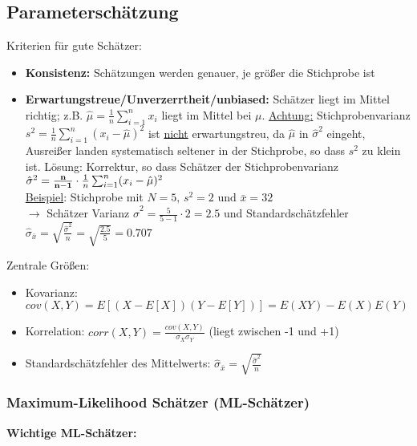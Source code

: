 \subsection{Parameterschätzung}

Kriterien für gute Schätzer:
\begin{itemize}
    \item \textbf{Konsistenz:} Schätzungen werden genauer, je größer die Stichprobe ist
    \item \textbf{Erwartungstreue/Unverzerrtheit/unbiased:} Schätzer liegt im Mittel richtig; z.B. \(\hat{\mu}=\frac{1}{n}\sum_{i=1}^{n}x_i\) liegt im Mittel bei \(\mu\). \underline{Achtung:} Stichprobenvarianz \(s^2=\frac{1}{n}\sum_{i=1}^{n}(x_i-\hat{\mu})^2\) ist \underline{nicht} erwartungstreu, da \(\hat{\mu}\) in \(\hat{\sigma}^2\) eingeht, Ausreißer landen systematisch seltener in der Stichprobe, so dass \(s^2\) zu klein ist. Lösung: Korrektur, so dass Schätzer der Stichprobenvarianz \(\hat{\sigma}^2=\bold{\frac{n}{n-1}}\cdot\frac{1}{n}\sum_{i=1}^{n}(x_i-\hat{\mu})^2\)\\
        \underline{Beispiel}: Stichprobe mit \(N=5\text{, }s^2=2 \text{ und } \bar{x}=32\)\\
        \(\rightarrow\) Schätzer Varianz \(\hat{\sigma}^2=\frac{5}{5-1}\cdot 2=2.5\) und Standardschätzfehler \(\hat{\sigma}_{\bar{x}}=\sqrt{\frac{\hat{\sigma}^2}{n}}=\sqrt{\frac{2.5}{5}}=0.707\)
\end{itemize}

Zentrale Größen:
\begin{itemize}
    \item Kovarianz: \(cov(X,Y)=E[(X-E[X])(Y-E[Y])]=E(XY)-E(X)E(Y)\)
    \item Korrelation: \(corr(X,Y)=\frac{cov(X,Y)}{\sigma_X\sigma_Y}\) (liegt zwischen -1 und +1)
    \item Standardschätzfehler des Mittelwerts: \(\hat{\sigma}_{\bar{x}}=\sqrt{\frac{\hat{\sigma}^2}{n}}\)
\end{itemize}


\subsubsection{Maximum-Likelihood Schätzer (ML-Schätzer)}

\textbf{Wichtige ML-Schätzer:}

